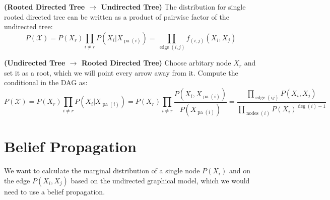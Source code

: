 \begin{proposition}{\textbf{(Rooted Directed Tree $\boldsymbol \rightarrow$ Undirected Tree)}}
    The distribution for single rooted directed tree can be written as a product of pairwise factor of the undirected tree:
    \begin{equation*}
        P(\mathcal{X}) = P(X_r)\prod_{i\ne r}P(X_i | X_{\operatorname{pa}(i)}) = \prod_{\operatorname{edge}(i,j)}f_{(i,j)}(X_i, X_j)
    \end{equation*} 
\end{proposition}

\begin{proposition}{\textbf{(Undirected Tree $\boldsymbol \rightarrow$ Rooted Directed Tree)}}
    Choose arbitary node $X_r$ and set it as a root, which we will point every arrow away from it. Compute the conditional in the DAG as:
    \begin{equation*}
        P(\mathcal{X}) = P(X_r) \prod_{i\ne r}P(X_i|X_{\operatorname{pa}(i)}) = P(X_r)\prod_{i\ne r}\frac{P(X_i, X_{\operatorname{pa}(i)})}{P(X_{\operatorname{pa}(i)})} = \frac{\prod_{\operatorname{edge}(ij)}P(X_i,X_j)}{\prod_{\operatorname{nodes}(i)} P(X_i)^{\operatorname{deg}(i)- 1}}
    \end{equation*}
\end{proposition}

\section{Belief Propagation}

\begin{remark}
    We want to calculate the marginal distribution of a single node $P(X_i)$ and on the edge $P(X_i, X_j)$ based on the undirected graphical model, which we would need to use a belief propagation.
\end{remark}

